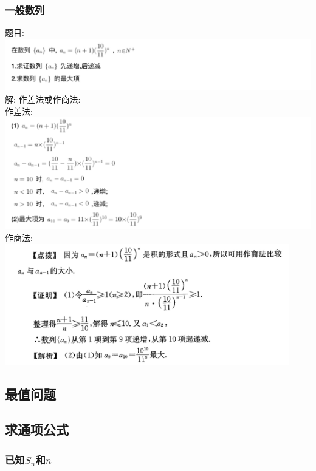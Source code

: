\documentclass[hyperref, UTF8,11pt,a4paper]{ctexart} %
\begin{document}
\subsubsection{一般数列}
{\color{red}  题目: } \\
\includegraphics[width=500pt]  {pic/shulie/yibandandiaoxingtimu.jpg} \\
解: {\color{blue}  作差法或作商法: }\\
作差法: \\
\includegraphics[width=500pt]  {pic/shulie/yibandandiaoxingdaan1.jpg} \\
作商法: \\
\includegraphics[width=350pt]  {pic/shulie/yibandandiaoxingdaan2.jpg} \\


\subsection{最值问题}
\subsection{求通项公式}
\subsubsection{已知$S_{n}$和$n$}
\end{document}
